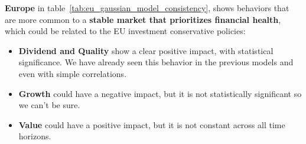 \documentclass[11pt,english,a4paper,hidelinks]{book}
\begin{document}
\noindent \textbf{Europe} in table~\ref{tab:eu_gaussian_model_consistency}, shows behaviors that are more common to a \textbf{stable market that prioritizes financial health}, which could be related to the EU investment conservative policies:
\begin{itemize}
    \item \textbf{Dividend and Quality} show a clear positive impact, with statistical significance. We have already seen this behavior in the previous models and even with simple correlations.
    \item \textbf{Growth} could have a negative impact, but it is not statistically significant so we can't be sure.
    \item \textbf{Value} could have a positive impact, but it is not constant across all time horizons.
\end{itemize}
\end{document}
